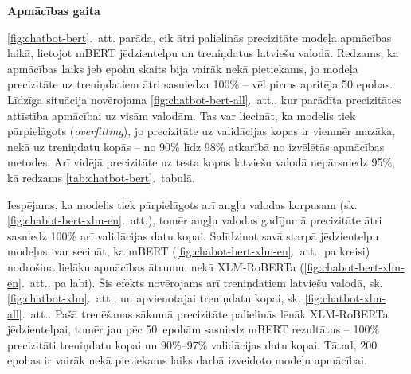 

\textbf{Apmācības gaita}

\ref{fig:chatbot-bert}.~att. parāda, cik ātri palielinās precizitāte modeļa apmācības laikā, lietojot mBERT jēdzientelpu un treniņdatus latviešu valodā. Redzams, ka apmācības laiks jeb epohu skaits bija vairāk nekā pietiekams, jo modeļa precizitāte uz treniņdatiem ātri sasniedza 100\% -- vēl pirms apritēja 50 epohas. 
Līdzīga situācija novērojama \ref{fig:chatbot-bert-all}.~att., kur parādīta precizitātes attīstība apmācībai uz visām valodām.
Tas var liecināt, ka modelis tiek pārpielāgots (\textit{overfitting}), jo precizitāte uz validācijas kopas ir vienmēr mazāka, nekā uz treniņdatu kopās -- no 90\% līdz 98\% atkarībā no izvēlētās apmācības metodes.
Arī vidējā precizitāte uz testa kopas latviešu valodā nepārsniedz 95\%, kā redzams \ref{tab:chatbot-bert}.~tabulā.

Iespējams, ka modelis tiek pārpielāgots arī angļu valodas korpusam (sk. \ref{fig:chabot-bert-xlm-en}.~att.), tomēr angļu valodas gadījumā precizitāte ātri sasniedz 100\% arī validācijas datu kopai. 
Salīdzinot savā starpā jēdzientelpu modeļus, var secināt, ka mBERT (\ref{fig:chabot-bert-xlm-en}.~att., pa kreisi) nodrošina lielāku apmācības ātrumu, nekā XLM-RoBERTa (\ref{fig:chabot-bert-xlm-en}.~att., pa labi).
Šis efekts novērojams arī treniņdatiem latviešu valodā, sk. \ref{fig:chatbot-xlm}.~att., un apvienotajai treniņdatu kopai, sk. \ref{fig:chatbot-xlm-all}.~att..
Pašā trenēšanas sākumā precizitāte palielinās lēnāk XLM-RoBERTa jēdzientelpai, tomēr jau pēc 50~epohām sasniedz mBERT rezultātus -- 100\% precizitāti treniņdatu kopai un 90\%--97\% validācijas datu kopai.
Tātad, 200 epohas ir vairāk nekā pietiekams laiks darbā izveidoto modeļu apmācībai.





